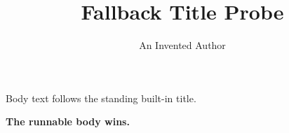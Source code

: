 \documentclass{article}
\title{Fallback Title Probe}
\author{An Invented Author}
\renewcommand{\maketitle}{\begingroup\venuetitlebox\venuenotice\endgroup}
\renewcommand{\titlepage}{\textbf{The runnable body wins.}}
\begin{document}
\maketitle

Body text follows the standing built-in title.

\titlepage
\end{document}
